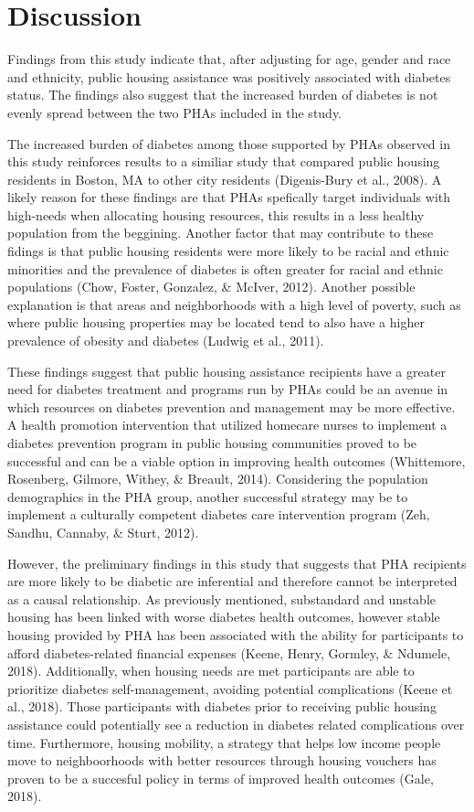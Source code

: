 \documentclass [11pt, proquest] {uwthesis}[2015/03/03]
\begin{document}
\section{Discussion}\label{discussion-1}

Findings from this study indicate that, after adjusting for age, gender
and race and ethnicity, public housing assistance was positively
associated with diabetes status. The findings also suggest that the
increased burden of diabetes is not evenly spread between the two PHAs
included in the study.

The increased burden of diabetes among those supported by PHAs observed
in this study reinforces results to a similiar study that compared
public housing residents in Boston, MA to other city residents
(Digenis-Bury et al., 2008). A likely reason for these findings are that
PHAs spefically target individuals with high-needs when allocating
housing resources, this results in a less healthy population from the
beggining. Another factor that may contribute to these fidings is that
public housing residents were more likely to be racial and ethnic
minorities and the prevalence of diabetes is often greater for racial
and ethnic populations (Chow, Foster, Gonzalez, \& McIver, 2012).
Another possible explanation is that areas and neighborhoods with a high
level of poverty, such as where public housing properties may be located
tend to also have a higher prevalence of obesity and diabetes (Ludwig et
al., 2011).

These findings suggest that public housing assistance recipients have a
greater need for diabetes treatment and programs run by PHAs could be an
avenue in which resources on diabetes prevention and management may be
more effective. A health promotion intervention that utilized homecare
nurses to implement a diabetes prevention program in public housing
communities proved to be successful and can be a viable option in
improving health outcomes (Whittemore, Rosenberg, Gilmore, Withey, \&
Breault, 2014). Considering the population demographics in the PHA
group, another successful strategy may be to implement a culturally
competent diabetes care intervention program (Zeh, Sandhu, Cannaby, \&
Sturt, 2012).

However, the preliminary findings in this study that suggests that PHA
recipients are more likely to be diabetic are inferential and therefore
cannot be interpreted as a causal relationship. As previously mentioned,
substandard and unstable housing has been linked with worse diabetes
health outcomes, however stable housing provided by PHA has been
associated with the ability for participants to afford diabetes-related
financial expenses (Keene, Henry, Gormley, \& Ndumele, 2018).
Additionally, when housing needs are met participants are able to
prioritize diabetes self-management, avoiding potential complications
(Keene et al., 2018). Those participants with diabetes prior to
receiving public housing assistance could potentially see a reduction in
diabetes related complications over time. Furthermore, housing mobility,
a strategy that helps low income people move to neighboorhoods with
better resources through housing vouchers has proven to be a succesful
policy in terms of improved health outcomes (Gale, 2018).
\end{document}
